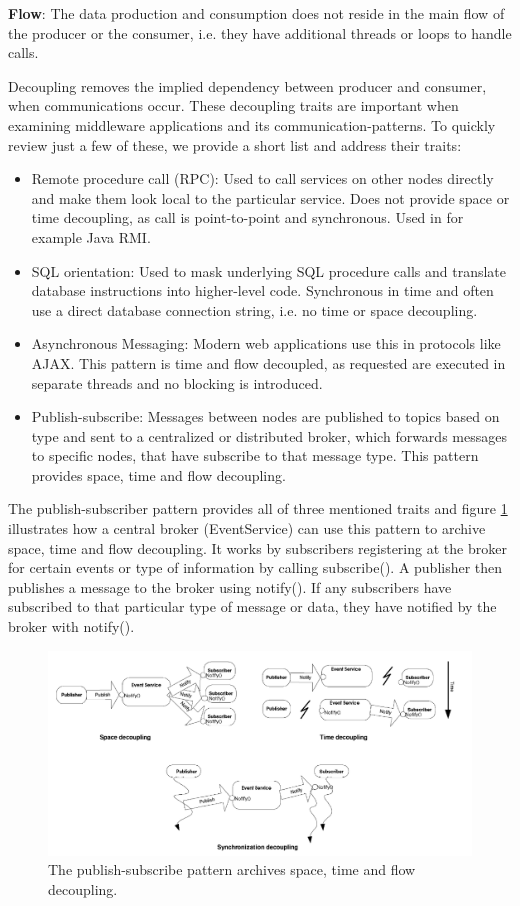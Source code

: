 \textbf{Flow}: The data production and consumption does not reside in the main flow of the producer or the consumer, i.e. they have additional threads or loops to handle calls.

Decoupling removes the implied dependency between producer and consumer, when communications occur. These decoupling traits are important when examining middleware applications and its communication-patterns. To quickly review just a few of these, we provide a short list and address their traits:

\begin{itemize}
	\item Remote procedure call (RPC): Used to call services on other nodes directly and make them look local to the particular service. Does not provide space or time decoupling, as call is point-to-point and synchronous. Used in for example Java RMI.
	\item SQL orientation: Used to mask underlying SQL procedure calls and translate database instructions into higher-level code. Synchronous in time and often use a direct database connection string, i.e. no time or space decoupling.
	\item Asynchronous Messaging: Modern web applications use this in protocols like AJAX. This pattern is time and flow decoupled, as requested are executed in separate threads and no blocking is introduced.
	\item Publish-subscribe: Messages between nodes are published to topics based on type and sent to a centralized or distributed broker, which forwards messages to specific nodes, that have subscribe to that message type. This pattern provides space, time and flow decoupling.
\end{itemize}

The publish-subscriber pattern provides all of three mentioned traits and figure \ref{fig:pubsub} illustrates how a central broker (EventService) can use this pattern to archive space, time and flow decoupling. It works by subscribers registering at the broker for certain events or type of information by calling subscribe(). A publisher then publishes a message to the broker using notify(). If any subscribers have subscribed to that particular type of message or data, they have notified by the broker with notify().

\begin{figure}[h!]\label{}
	\centering
	\includegraphics[scale=0.5]{middleware/pubsub.png}
	\caption{The publish-subscribe pattern archives space, time and flow decoupling.}
	\label{fig:pubsub}
\end{figure}